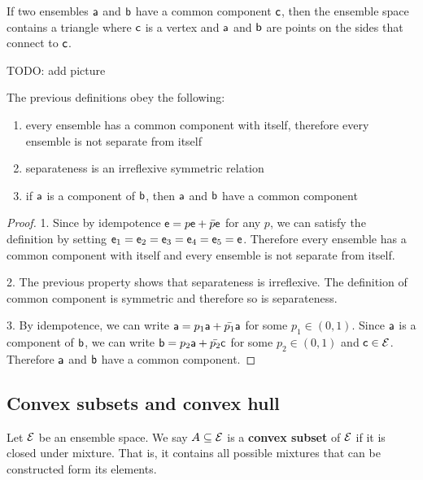 \begin{remark}
	If two ensembles $\ens[a]$ and $\ens[b]$ have a common component $\ens[c]$, then the ensemble space contains a triangle where $\ens[c]$ is a vertex and $\ens[a]$ and $\ens[b]$ are points on the sides that connect to $\ens[c]$.
	
	TODO: add picture
\end{remark}

\begin{coro}
	The previous definitions obey the following:
	\begin{enumerate}
		\item every ensemble has a common component with itself, therefore every ensemble is not separate from itself
		\item separateness is an irreflexive symmetric relation
		\item if $\ens[a]$ is a component of $\ens[b]$, then $\ens[a]$ and $\ens[b]$ have a common component
	\end{enumerate}
\end{coro}

\begin{proof}
	1. Since by idempotence $\ens = p \ens + \bar{p} \ens$ for any $p$, we can satisfy the definition by setting $\ens_1 = \ens_2 = \ens_3 = \ens_4 = \ens_5 = \ens$. Therefore every ensemble has a common component with itself and every ensemble is not separate from itself.
	
	2. The previous property shows that separateness is irreflexive. The definition of common component is symmetric and therefore so is separateness.
	
	3. By idempotence, we can write $\ens[a] = p_1 \ens[a] + \bar{p_1} \ens[a]$ for some $p_1 \in (0,1)$. Since $\ens[a]$ is a component of $\ens[b]$, we can write $\ens[b] = p_2 \ens[a] + \bar{p_2} \ens[c]$ for some $p_2 \in (0, 1)$ and $\ens[c] \in \Ens$. Therefore $\ens[a]$ and $\ens[b]$ have a common component.
\end{proof}

\subsection{Convex subsets and convex hull}

\begin{defn}
	Let $\Ens$ be an ensemble space. We say $A \subseteq \Ens$ is a \textbf{convex subset} of $\Ens$ if it is closed under mixture. That is, it contains all possible mixtures that can be constructed form its elements.
\end{defn}

